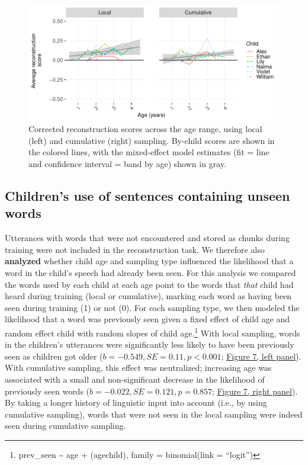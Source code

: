\documentclass[
  english,
  man,mask,floatsintext]{apa6}
\begin{document}
\begin{figure}
\includegraphics[width=0.95\linewidth]{CBL-age_invariance_files/figure-latex/fig6-1} \caption{Corrected reconstruction scores across the age range, using local (left) and cumulative (right) sampling. By-child scores are shown in the colored lines, with the mixed-effect model estimates (fit = line and confidence interval = band by age) shown in gray.}\label{fig:fig6}
\end{figure}

\hypertarget{childrens-use-of-sentences-containing-unseen-words}{%
\subsection{\texorpdfstring{Children's use of \textbf{sentences containing} unseen words}{Children's use of sentences containing unseen words}}\label{childrens-use-of-sentences-containing-unseen-words}}

Utterances with words that were not encountered and stored as chunks during training were not included in the reconstruction task. We therefore also \textbf{analyzed} whether child age and sampling type influenced the likelihood that a word in the child's speech had already been seen. For this analysis we compared the words used by each child at each age point to the words that \emph{that} child had heard during training (local or cumulative), marking each word as having been seen during training (1) or not (0). For each sampling type, we then modeled the likelihood that a word was previously seen given a fixed effect of child age and random effect child with random slopes of child age.\footnote{prev\_seen \textasciitilde{} age + (age\textbar child), family = binomial(link = \enquote{logit})} With local sampling, words in the children's utterances were significantly less likely to have been previously seen as children got older (\(b = -0.549, SE = 0.11, p < 0.001\); \protect\hyperlink{fig7}{Figure 7, left panel}). With cumulative sampling, this effect was neutralized; increasing age was associated with a small and non-significant decrease in the likelihood of previously seen words (\(b = -0.022, SE = 0.121, p = 0.857\); \protect\hyperlink{fig7}{Figure 7, right panel}). By taking a longer history of linguistic input into account (i.e., by using cumulative sampling), words that were not seen in the local sampling were indeed seen during cumulative sampling.
\end{document}

